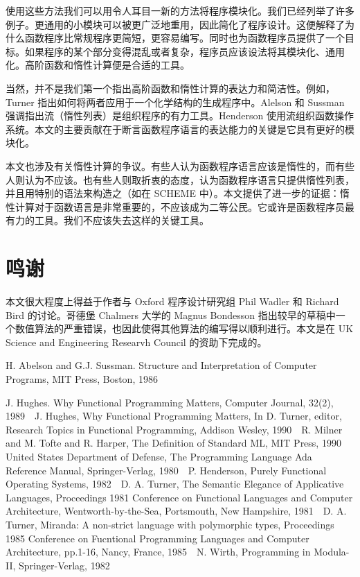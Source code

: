 \documentclass[12pt]{article}
\begin{document}
使用这些方法我们可以用令人耳目一新的方法将程序模块化。我们已经列举了许多例子。更通用的小模块可以被更广泛地重用，因此简化了程序设计。这便解释了为什么函数程序比常规程序更简短，更容易编写。同时也为函数程序员提供了一个目标。如果程序的某个部分变得混乱或者复杂，程序员应该设法将其模块化、通用化。高阶函数和惰性计算便是合适的工具。

当然，并不是我们第一个指出高阶函数和惰性计算的表达力和简洁性。例如，Turner 指出如何将两者应用于一个化学结构的生成程序中\cite[Tur81]{Tur81}。Alelson 和 Sussman 强调指出流（惰性列表）是组织程序的有力工具\cite[AS86]{AS86}。Henderson 使用流组织函数操作系统\cite[P.H82]{P.H82}。本文的主要贡献在于断言函数程序语言的表达能力的关键是它具有更好的模块化。

本文也涉及有关惰性计算的争议。有些人认为函数程序语言应该是惰性的，而有些人则认为不应该。也有些人则取折衷的态度，认为函数程序语言只提供惰性列表，并且用特别的语法来构造之（如在 SCHEME\cite[AS86]{AS86} 中）。本文提供了进一步的证据：惰性计算对于函数语言是非常重要的，不应该成为二等公民。它或许是函数程序员最有力的工具。我们不应该失去这样的关键工具。

\section{鸣谢}

本文很大程度上得益于作者与 Oxford 程序设计研究组 Phil Wadler 和 Richard Bird 的讨论。哥德堡 Chalmers 大学的 Magnus Bondesson 指出较早的草稿中一个数值算法的严重错误，也因此使得其他算法的编写得以顺利进行。本文是在 UK Science and Engineering Researvh Council 的资助下完成的。

\begin{thebibliography}{9}

 H. Abelson and G.J. Sussman. Structure and Interpretation of Computer Programs, MIT Press, Boston, 1986 %

 J. Hughes. Why Functional Programming Matters, Computer Journal, 32(2), 1989
  J. Hughes, Why Functional Programming Matters, In D. Turner, editor, Research Topics in Functional Programming, Addison Wesley, 1990
  R. Milner and M. Tofte and R. Harper, The Definition of Standard ML, MIT Press, 1990
  United States Department of Defense, The Programming Language Ada Reference Manual, Springer-Verlag, 1980
  P. Henderson, Purely Functional Operating Systems, 1982
  D. A. Turner, The Semantic Elegance of Applicative Languages, Proceedings 1981 Conference on Functional Languages and Computer Architecture, Wentworth-by-the-Sea, Portsmouth, New Hampshire, 1981
  D. A. Turner, Miranda: A non-strict language with polymorphic types, Proceedings 1985 Conference on Fucntional Programming Languages and Computer Architecture, pp.1-16, Nancy, France, 1985
  N. Wirth, Programming in Modula-II, Springer-Verlag, 1982

\end{thebibliography}
\end{document}
